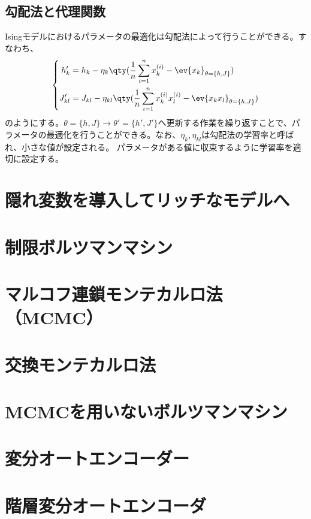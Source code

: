 \documentclass[a4paper,11pt,uplatex]{jsarticle}%
\begin{document}
\subsection{勾配法と代理関数}
Isingモデルにおけるパラメータの最適化は勾配法によって行うことができる。すなわち、
\begin{equation}
  \left\{
  \begin{aligned}
    h_k'    & = h_k - \eta_k\qty(\frac{1}{n}\sum_{i=1}^{n}x_{k}^{(i)}-\ev{x_k}_{\theta=\{h,J\}})                     \\
    J_{kl}' & = J_{kl} - \eta_{kl}\qty(\frac{1}{n}\sum_{i=1}^{n}x_{k}^{(i)}x_{l}^{(i)}-\ev{x_kx_l}_{\theta=\{h,J\}})
  \end{aligned}
  \right.
\end{equation}
のようにする。$\theta=\{h,J\}\to\theta' = \{h',J'\}$へ更新する作業を繰り返すことで、パラメータの最適化を行うことができる。なお、$\eta_k,\eta_{kl}$は勾配法の学習率と呼ばれ、小さな値が設定される。
パラメータがある値に収束するように学習率を適切に設定する。

\section{隠れ変数を導入してリッチなモデルへ}

\section{制限ボルツマンマシン}

\section{マルコフ連鎖モンテカルロ法（MCMC）}

\section{交換モンテカルロ法}

\section{MCMCを用いないボルツマンマシン}

\section{変分オートエンコーダー}

\section{階層変分オートエンコーダ}
\end{document}
